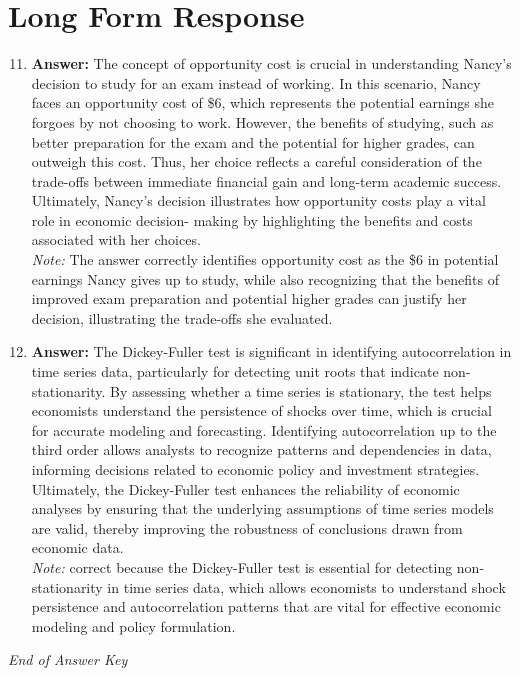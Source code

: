 \documentclass[12pt]{article}
\begin{document}
\section*{Long Form Response}
\begin{enumerate}[label=\arabic*.]
\setcounter{enumi}{10}
\item \textbf{Answer:} The concept of opportunity cost is crucial in understanding Nancy's decision to study for an exam instead of working. In this scenario, Nancy faces an opportunity cost of \$6, which represents the potential earnings she forgoes by not choosing to work. However, the benefits of studying, such as better preparation for the exam and the potential for higher grades, can outweigh this cost. Thus, her choice reflects a careful consideration of the trade-offs between immediate financial gain and long-term academic success. Ultimately, Nancy's decision illustrates how opportunity costs play a vital role in economic decision- making by highlighting the benefits and costs associated with her choices.
\\ \textit{Note:} The answer correctly identifies opportunity cost as the \$6 in potential earnings Nancy gives up to study, while also recognizing that the benefits of improved exam preparation and potential higher grades can justify her decision, illustrating the trade-offs she evaluated.
\item \textbf{Answer:} The Dickey-Fuller test is significant in identifying autocorrelation in time series data, particularly for detecting unit roots that indicate non-stationarity. By assessing whether a time series is stationary, the test helps economists understand the persistence of shocks over time, which is crucial for accurate modeling and forecasting. Identifying autocorrelation up to the third order allows analysts to recognize patterns and dependencies in data, informing decisions related to economic policy and investment strategies. Ultimately, the Dickey-Fuller test enhances the reliability of economic analyses by ensuring that the underlying assumptions of time series models are valid, thereby improving the robustness of conclusions drawn from economic data.
\\ \textit{Note:} correct because the Dickey-Fuller test is essential for detecting non-stationarity in time series data, which allows economists to understand shock persistence and autocorrelation patterns that are vital for effective economic modeling and policy formulation.
\end{enumerate}

\vfill
\noindent\textit{End of Answer Key}
\end{document}
